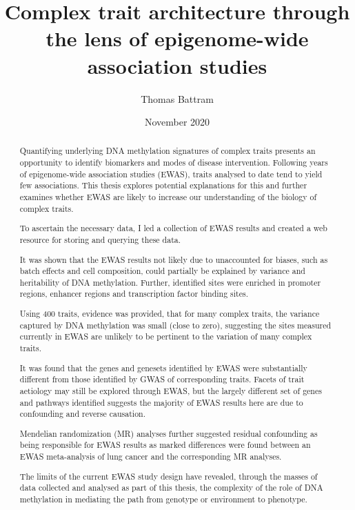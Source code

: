 \documentclass[11pt,oneside]{bristolthesis}
\title{Complex trait architecture through the lens of epigenome-wide association studies}
\author{Thomas Battram}
\date{November 2020}
\begin{document}
  \maketitle

\frontmatter %
\pagestyle{empty} %
  \begin{abstract}
    Quantifying underlying DNA methylation signatures of complex traits presents an opportunity to identify biomarkers and modes of disease intervention. Following years of epigenome-wide association studies (EWAS), traits analysed to date tend to yield few associations. This thesis explores potential explanations for this and further examines whether EWAS are likely to increase our understanding of the biology of complex traits.

    To ascertain the necessary data, I led a collection of EWAS results and created a web resource for storing and querying these data.

    It was shown that the EWAS results not likely due to unaccounted for biases, such as batch effects and cell composition, could partially be explained by variance and heritability of DNA methylation. Further, identified sites were enriched in promoter regions, enhancer regions and transcription factor binding sites.

    Using 400 traits, evidence was provided, that for many complex traits, the variance captured by DNA methylation was small (close to zero), suggesting the sites measured currently in EWAS are unlikely to be pertinent to the variation of many complex traits.

    It was found that the genes and genesets identified by EWAS were substantially different from those identified by GWAS of corresponding traits. Facets of trait aetiology may still be explored through EWAS, but the largely different set of genes and pathways identified suggests the majority of EWAS results here are due to confounding and reverse causation.

    Mendelian randomization (MR) analyses further suggested residual confounding as being responsible for EWAS results as marked differences were found between an EWAS meta-analysis of lung cancer and the corresponding MR analyses.

    The limits of the current EWAS study design have revealed, through the masses of data collected and analysed as part of this thesis, the complexity of the role of DNA methylation in mediating the path from genotype or environment to phenotype.
  \end{abstract}
\end{document}
